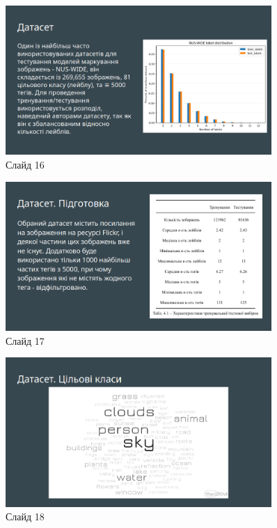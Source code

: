 \documentclass{udstu}
\begin{document}
\begin{figure}[!ht]
	\centering
	\includegraphics[width=0.9\textwidth]{PNG/present/present-16}
	\caption{Слайд 16}
\end{figure}

\begin{figure}[!ht]
	\centering
	\includegraphics[width=0.9\textwidth]{PNG/present/present-17}
	\caption{Слайд 17}
\end{figure}

\begin{figure}[!ht]
	\centering
	\includegraphics[width=0.9\textwidth]{PNG/present/present-18}
	\caption{Слайд 18}
\end{figure}
\end{document}
